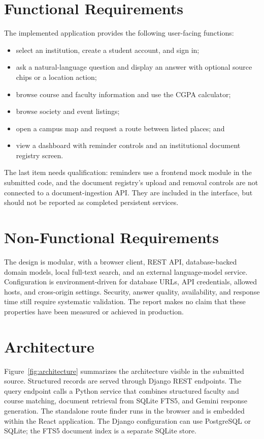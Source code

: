 \documentclass[11pt,a4paper]{report}
\begin{document}
\section{Functional Requirements}
The implemented application provides the following user-facing functions:
\begin{itemize}[leftmargin=*]
  \item select an institution, create a student account, and sign in;
  \item ask a natural-language question and display an answer with optional
    source chips or a location action;
  \item browse course and faculty information and use the CGPA calculator;
  \item browse society and event listings;
  \item open a campus map and request a route between listed places; and
  \item view a dashboard with reminder controls and an institutional document
    registry screen.
\end{itemize}

The last item needs qualification: reminders use a frontend mock module in the
submitted code, and the document registry's upload and removal controls are
not connected to a document-ingestion API. They are included in the interface,
but should not be reported as completed persistent services.

\section{Non-Functional Requirements}
The design is modular, with a browser client, REST API, database-backed domain
models, local full-text search, and an external language-model service.
Configuration is environment-driven for database URLs, API credentials,
allowed hosts, and cross-origin settings. Security, answer quality,
availability, and response time still require systematic validation. The
report makes no claim that these properties have been measured or achieved in
production.

\clearpage
\section{Architecture}
Figure~\ref{fig:architecture} summarizes the architecture visible in the
submitted source. Structured records are served through Django REST endpoints.
The query endpoint calls a Python service that combines structured faculty and
course matching, document retrieval from SQLite FTS5, and Gemini response
generation. The standalone route finder runs in the browser and is embedded
within the React application. The Django configuration can use PostgreSQL or
SQLite; the FTS5 document index is a separate SQLite store.
\end{document}
